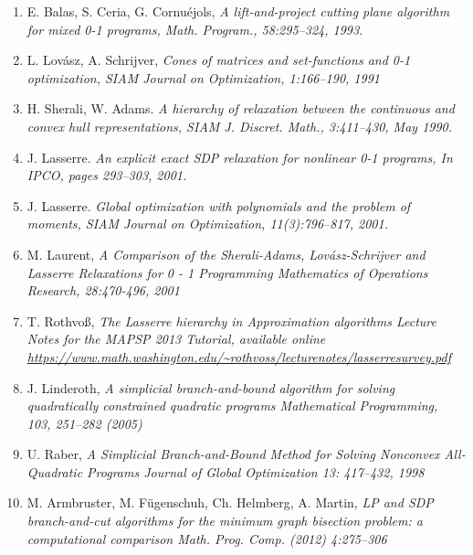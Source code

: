 \documentclass[12pt]{book}
\theoremstyle{definition}
\begin{document}
\begin{enumerate}
\item E. Balas, S. Ceria, G. Cornuéjols, \it A lift-and-project cutting plane algorithm
for mixed 0-1 programs, \rm Math. Program., 58:295–324, 1993.
\label{BalasLiftandProjectCuttingPlane}
%
\item L. Lovász, A. Schrijver, \it Cones of matrices and set-functions and 0-1 optimization, \rm
SIAM Journal on Optimization, 1:166–190, 1991
\label{LovaszSchriverHrierarchy}
%
\item H. Sherali, W. Adams. \it A hierarchy of relaxation between the continuous
and convex hull representations, \rm SIAM J. Discret. Math., 3:411–430, May
1990.
\label{SheraliAdamsHierarchy}
%
\item  J. Lasserre. \it An explicit exact SDP relaxation for nonlinear 0-1 programs, \rm In
IPCO, pages 293–303, 2001.
\label{LasserreExplicitExactSDP}
%
\item  J. Lasserre. \it Global optimization with polynomials and the problem of moments, \rm
SIAM Journal on Optimization,  11(3):796–817, 2001.
\label{LasserreProblemOfMoments}
%
\item M. Laurent, \it A Comparison of the Sherali-Adams, Lovász-Schrijver and Lasserre Relaxations for 0 - 1 Programming \rm Mathematics of Operations Research, 28:470-496, 2001
\label{LaurentComparisonOfHierarchies}
% 
\item T. Rothvoß, \it The Lasserre hierarchy in Approximation algorithms \rm
Lecture Notes for the MAPSP 2013 Tutorial, available online
\url{https://www.math.washington.edu/~rothvoss/lecturenotes/lasserresurvey.pdf}
\label{RothLassereSurvey}




\item J. Linderoth, \it A simplicial branch-and-bound algorithm for solving quadratically constrained quadratic programs \rm 
Mathematical Programming, 103, 251–282 (2005)
\label{LinderothSimplicialBranchAndBound}
%
\item U. Raber, \it A Simplicial Branch-and-Bound Method for Solving Nonconvex All-Quadratic Programs \rm
Journal of Global Optimization 13: 417–432, 1998
\label{RaberSimplicialBranchAndBound}
%
\item M. Armbruster, M. Fügenschuh, Ch. Helmberg, A. Martin, \it LP and SDP branch-and-cut algorithms for the minimum graph bisection problem: a computational comparison \rm
Math. Prog. Comp. (2012) 4:275–306
\label{ComparativeBNBStudyForGP}




\end{enumerate}
\end{document}
